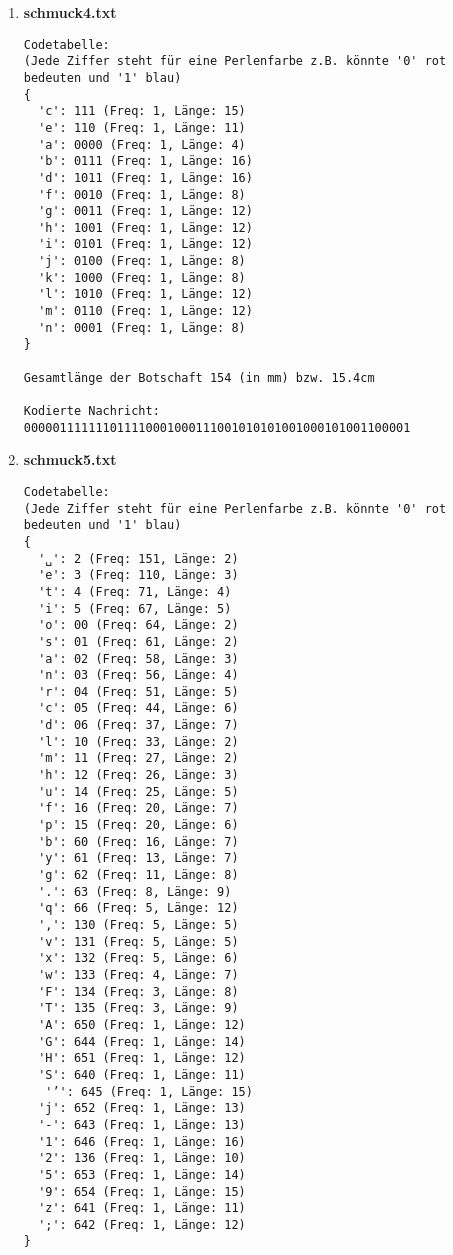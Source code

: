 \documentclass[a4paper,10pt,ngerman]{scrartcl}
\begin{document}
\begin{enumerate}
\begin{verbatim}
Gesamtlänge der Botschaft 279 (in mm) bzw. 27.9cm

Kodierte Nachricht: 1111111111111111111111111111111111010222222222222222222222222222222222201000000000000
000000000000000000000000000000000000000000000000000000000010020012011021022
\end{verbatim}
  \item \textbf{schmuck4.txt}
\begin{verbatim}
Codetabelle:
(Jede Ziffer steht für eine Perlenfarbe z.B. könnte '0' rot bedeuten und '1' blau)
{
  'c': 111 (Freq: 1, Länge: 15)
  'e': 110 (Freq: 1, Länge: 11)
  'a': 0000 (Freq: 1, Länge: 4)
  'b': 0111 (Freq: 1, Länge: 16)
  'd': 1011 (Freq: 1, Länge: 16)
  'f': 0010 (Freq: 1, Länge: 8)
  'g': 0011 (Freq: 1, Länge: 12)
  'h': 1001 (Freq: 1, Länge: 12)
  'i': 0101 (Freq: 1, Länge: 12)
  'j': 0100 (Freq: 1, Länge: 8)
  'k': 1000 (Freq: 1, Länge: 8)
  'l': 1010 (Freq: 1, Länge: 12)
  'm': 0110 (Freq: 1, Länge: 12)
  'n': 0001 (Freq: 1, Länge: 8)
}

Gesamtlänge der Botschaft 154 (in mm) bzw. 15.4cm

Kodierte Nachricht: 000001111111011110001000111001010101001000101001100001
\end{verbatim}
  \item \textbf{schmuck5.txt}
\begin{verbatim}
Codetabelle:
(Jede Ziffer steht für eine Perlenfarbe z.B. könnte '0' rot bedeuten und '1' blau)
{
  '␣': 2 (Freq: 151, Länge: 2)
  'e': 3 (Freq: 110, Länge: 3)
  't': 4 (Freq: 71, Länge: 4)
  'i': 5 (Freq: 67, Länge: 5)
  'o': 00 (Freq: 64, Länge: 2)
  's': 01 (Freq: 61, Länge: 2)
  'a': 02 (Freq: 58, Länge: 3)
  'n': 03 (Freq: 56, Länge: 4)
  'r': 04 (Freq: 51, Länge: 5)
  'c': 05 (Freq: 44, Länge: 6)
  'd': 06 (Freq: 37, Länge: 7)
  'l': 10 (Freq: 33, Länge: 2)
  'm': 11 (Freq: 27, Länge: 2)
  'h': 12 (Freq: 26, Länge: 3)
  'u': 14 (Freq: 25, Länge: 5)
  'f': 16 (Freq: 20, Länge: 7)
  'p': 15 (Freq: 20, Länge: 6)
  'b': 60 (Freq: 16, Länge: 7)
  'y': 61 (Freq: 13, Länge: 7)
  'g': 62 (Freq: 11, Länge: 8)
  '.': 63 (Freq: 8, Länge: 9)
  'q': 66 (Freq: 5, Länge: 12)
  ',': 130 (Freq: 5, Länge: 5)
  'v': 131 (Freq: 5, Länge: 5)
  'x': 132 (Freq: 5, Länge: 6)
  'w': 133 (Freq: 4, Länge: 7)
  'F': 134 (Freq: 3, Länge: 8)
  'T': 135 (Freq: 3, Länge: 9)
  'A': 650 (Freq: 1, Länge: 12)
  'G': 644 (Freq: 1, Länge: 14)
  'H': 651 (Freq: 1, Länge: 12)
  'S': 640 (Freq: 1, Länge: 11)
   '’': 645 (Freq: 1, Länge: 15)
  'j': 652 (Freq: 1, Länge: 13)
  '-': 643 (Freq: 1, Länge: 13)
  '1': 646 (Freq: 1, Länge: 16)
  '2': 136 (Freq: 1, Länge: 10)
  '5': 653 (Freq: 1, Länge: 14)
  '9': 654 (Freq: 1, Länge: 15)
  'z': 641 (Freq: 1, Länge: 11)
  ';': 642 (Freq: 1, Länge: 12)
}


\end{verbatim}
\end{enumerate}
\end{document}
